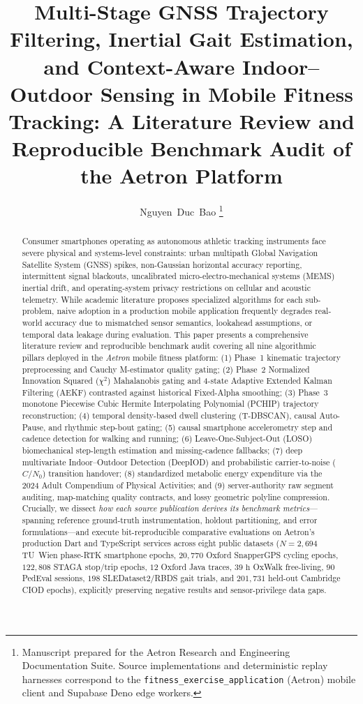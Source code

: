 \documentclass[journal]{IEEEtran}
\title{Multi-Stage GNSS Trajectory Filtering, Inertial Gait Estimation, and Context-Aware Indoor--Outdoor Sensing in Mobile Fitness Tracking: A Literature Review and Reproducible Benchmark Audit of the Aetron Platform}
\author{Nguyen~Duc~Bao%
\thanks{Manuscript prepared for the Aetron Research and Engineering Documentation Suite. Source implementations and deterministic replay harnesses correspond to the \texttt{fitness\_exercise\_application} (Aetron) mobile client and Supabase Deno edge workers.}}
\begin{document}
\maketitle

\begin{abstract}
Consumer smartphones operating as autonomous athletic tracking instruments face severe physical and systems-level constraints: urban multipath Global Navigation Satellite System (GNSS) spikes, non-Gaussian horizontal accuracy reporting, intermittent signal blackouts, uncalibrated micro-electro-mechanical systems (MEMS) inertial drift, and operating-system privacy restrictions on cellular and acoustic telemetry. While academic literature proposes specialized algorithms for each sub-problem, naive adoption in a production mobile application frequently degrades real-world accuracy due to mismatched sensor semantics, lookahead assumptions, or temporal data leakage during evaluation. This paper presents a comprehensive literature review and reproducible benchmark audit covering all nine algorithmic pillars deployed in the \emph{Aetron} mobile fitness platform: (1) Phase~1 kinematic trajectory preprocessing and Cauchy M-estimator quality gating; (2) Phase~2 Normalized Innovation Squared ($\chi^2$) Mahalanobis gating and 4-state Adaptive Extended Kalman Filtering (AEKF) contrasted against historical Fixed-Alpha smoothing; (3) Phase~3 monotone Piecewise Cubic Hermite Interpolating Polynomial (PCHIP) trajectory reconstruction; (4) temporal density-based dwell clustering (T-DBSCAN), causal Auto-Pause, and rhythmic step-bout gating; (5) causal smartphone accelerometry step and cadence detection for walking and running; (6) Leave-One-Subject-Out (LOSO) biomechanical step-length estimation and missing-cadence fallbacks; (7) deep multivariate Indoor--Outdoor Detection (DeepIOD) and probabilistic carrier-to-noise ($C/N_0$) transition handover; (8) standardized metabolic energy expenditure via the 2024 Adult Compendium of Physical Activities; and (9) server-authority raw segment auditing, map-matching quality contracts, and lossy geometric polyline compression. Crucially, we dissect \emph{how each source publication derives its benchmark metrics}---spanning reference ground-truth instrumentation, holdout partitioning, and error formulations---and execute bit-reproducible comparative evaluations on Aetron's production Dart and TypeScript services across eight public datasets ($N = 2{,}694$ TU~Wien phase-RTK smartphone epochs, $20{,}770$ Oxford SnapperGPS cycling epochs, $122{,}808$ STAGA stop/trip epochs, $12$ Oxford Java traces, $39\text{ h}$ OxWalk free-living, $90$ PedEval sessions, $198$ SLEDataset2/RBDS gait trials, and $201{,}731$ held-out Cambridge CIOD epochs), explicitly preserving negative results and sensor-privilege data gaps.
\end{abstract}
\end{document}
